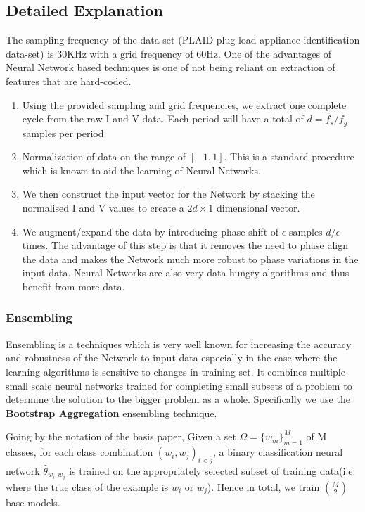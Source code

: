 \documentclass[11pt, a4paper]{article} %
\begin{document}
\subsection{Detailed Explanation}
The sampling frequency of the data-set (PLAID plug load appliance identification data-set) is 30KHz with a grid frequency of 60Hz. One of the advantages of Neural Network based techniques is one of not being reliant on extraction of features that are hard-coded.

\begin{enumerate}
    \item Using the provided sampling and grid frequencies, we extract one complete cycle from the raw I and V data. Each period will have a total of $d = f_s/f_g$ samples per period.
    \item Normalization of data on the range of $[-1,1]$. This is a standard procedure which is known to aid the learning of Neural Networks.
    \item We then construct the input vector for the Network by stacking the normalised I and V values to create a $2d\times1$ dimensional vector.
    \item We augment/expand the data by introducing phase shift of $\epsilon$ samples $d/\epsilon$ times. The advantage of this step is that it removes the need to phase align the data and makes the Network much more robust to phase variations in the input data. Neural Networks are also very data hungry algorithms and thus benefit from more data.
\end{enumerate}

\subsubsection{Ensembling}
Ensembling is a techniques which is very well known for increasing the accuracy and robustness of the Network to input data especially in the case where the learning algorithms is sensitive to changes in training set. It combines multiple small scale neural networks trained for completing small subsets of a problem to determine the solution to the bigger problem as a whole. Specifically we use the \textbf{Bootstrap Aggregation} ensembling technique.

Going by the notation of the basis paper, Given a set $\Omega = \{w_m\}_{m = 1}^M$ of M classes, for each class combination $(w_i,w_j)_{i<j}$, a binary classification neural network $\hat{\theta}_{w_i,w_j}$ is trained on the appropriately selected subset of training data(i.e. where the true class of the example is $w_i$ or $w_j$). Hence in total, we train $M \choose 2$ base models.
\end{document}

